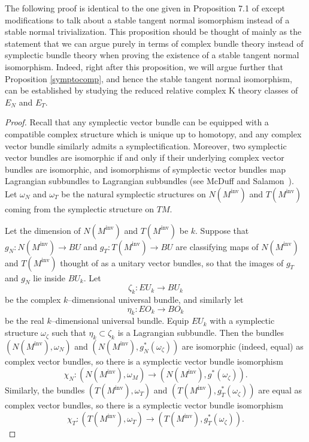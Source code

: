 \documentclass[11pt]{amsart}
\theoremstyle{definition}
\theoremstyle{remark}
\def\co{\colon }
\newcommand{\M}{M^{\operatorname{inv}}}
\numberwithin{equation}{section}
\begin{document}
The following proof is identical to the one given in Proposition 7.1 of \cite{Hendricks2012rank} except modifications to talk about a stable tangent normal isomorphism instead of a stable normal trivialization. This proposition should be thought of mainly as the statement that we can argue purely in terms of complex bundle theory instead of symplectic bundle theory when proving the existence of a stable tangent normal isomorphism. Indeed, right after this proposition, we will argue further that Proposition \ref{symptocomp}, and hence the stable tangent normal isomorphism, can be established by studying the reduced relative complex K theory classes of $E_N$ and $E_T$. 
\begin{proof}
Recall that any symplectic vector bundle
can be equipped with a compatible complex structure which is unique up to
homotopy, and any complex vector bundle similarly admits a
symplectification. Moreover, two symplectic vector bundles are isomorphic
if and only if their underlying complex vector bundles are isomorphic, and
isomorphisms of symplectic vector bundles map Lagrangian subbundles to
Lagrangian subbundles (see McDuff and
Salamon~\cite[Theorem~2.62]{McDuffSal}). Let $\omega_N$ and $\omega_T$ be the natural
symplectic structures on $N(\M)$ and $T(\M)$ coming from the symplectic
structure on $TM$. 



Let the dimension of $N(\M)$ and $T(\M)$ be $k$. Suppose that $g_N \co N(\M) \rightarrow BU$ and $g_T\co T(\M) \rightarrow BU$ are classifying
maps of $N(\M)$ and $T(\M)$ thought of as a unitary vector bundles, so
that the images of $g_T$ and $g_N$ lie inside $BU_{k}$. Let
$$\zeta_{k}\co EU_{k} \rightarrow
BU_{k}$$
be the complex $k$--dimensional
universal bundle, and similarly let
$$\eta_{k}\co
EO_{k} \rightarrow BO_{k}$$
be the real
$k$--dimensional universal bundle. Equip
$EU_{k}$ with a symplectic structure $\omega_{\zeta}$ such
that $\eta_{k} \subset \zeta_{k}$ is a
Lagrangian subbundle. Then the bundles $(N(\M), \omega_N)$
and $(N(\M), g_N^*(\omega_{\zeta}))$ are isomorphic (indeed,
equal) as complex vector bundles, so there is a symplectic vector bundle
isomorphism
$$\chi_N\co(N(\M), \omega_M) \rightarrow
(N(\M), g^*(\omega_{\zeta})).$$
Similarly, the bundles $(T(\M), \omega_T)$
and $(T(\M), g_T^*(\omega_{\zeta}))$ are equal as complex vector bundles, so there is a symplectic vector bundle
isomorphism
$$\chi_T\co(T(\M), \omega_T) \rightarrow
(T(\M), g_T^*(\omega_{\zeta})).$$


\end{proof}
\end{document}
